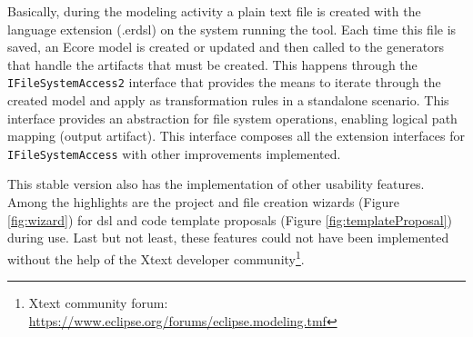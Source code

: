 Basically, during the modeling activity a plain text file is created with the language extension (.erdsl) on the system running the tool.
Each time this file is saved, an Ecore model is created or updated and then called to the generators that handle the artifacts that must be created.
This happens through the \texttt {IFileSystemAccess2} interface that provides the means to iterate through the created model and apply as transformation rules in a standalone scenario.
This interface provides an abstraction for file system operations, enabling logical path mapping (output artifact).
This interface composes all the extension interfaces for \texttt {IFileSystemAccess} with other improvements implemented.

%     

This stable version also has the implementation of other usability features.
Among the highlights are the project and file creation wizards (Figure \ref{fig:wizard}) for \ac{dsl} and code template proposals (Figure \ref{fig:templateProposal}) during use.
Last but not least, these features could not have been implemented without the help of the Xtext developer community\footnote{Xtext community forum: \url{https://www.eclipse.org/forums/eclipse.modeling.tmf}}.

